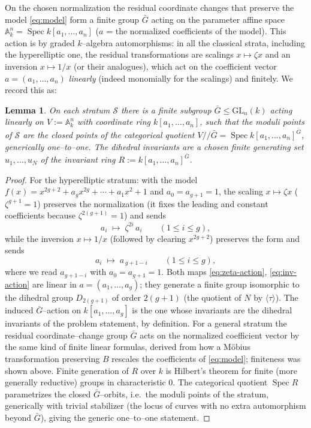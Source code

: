 \documentclass{amsart}
\newtheorem{lemma}[theorem]{Lemma}
\theoremstyle{definition}
\DeclareMathOperator{\Spec}{Spec}
\begin{document}
On the chosen normalization the residual coordinate changes that preserve the
model \eqref{eq:model} form a finite group $\bar G$ acting on the parameter affine
space $\mathbb{A}^n_k=\Spec k[a_1,\dots,a_n]$ ($a$ = the normalized coefficients of
the model). This action is by graded $k$--algebra automorphisms: in all the
classical strata, including the hyperelliptic one, the residual transformations
are scalings $x\mapsto \zeta x$ and an inversion $x\mapsto 1/x$ (or their
analogues), which act on the coefficient vector $a=(a_1,\dots,a_n)$ \emph{linearly}
(indeed monomially for the scalings) and finitely. We record this as:

\begin{lemma}\label{lem:linear}
On each stratum $\mathcal S$ there is a finite subgroup
$\bar G\le \mathrm{GL}_n(k)$ acting linearly on $V:=\mathbb{A}^n_k$ with
coordinate ring $k[a_1,\dots,a_n]$, such that the moduli points of $\mathcal S$ are
the closed points of the categorical quotient $V/\!\!/\bar G=\Spec
k[a_1,\dots,a_n]^{\bar G}$, generically one--to--one. The dihedral invariants are
a chosen finite generating set $u_1,\dots,u_N$ of the invariant ring
$R:=k[a_1,\dots,a_n]^{\bar G}$.
\end{lemma}

\begin{proof}
For the hyperelliptic stratum: with the model
$f(x)=x^{2g+2}+a_g x^{2g}+\cdots+a_1 x^2+1$ and $a_0=a_{g+1}=1$, the scaling
$x\mapsto\zeta x$ ($\zeta^{g+1}=1$) preserves the normalization (it fixes the
leading and constant coefficients because $\zeta^{2(g+1)}=1$) and sends
\begin{equation}\label{eq:zeta-action}
 a_i\;\longmapsto\;\zeta^{2i}\,a_i \qquad(1\le i\le g),
\end{equation}
while the inversion $x\mapsto 1/x$ (followed by clearing $x^{2g+2}$) preserves the
form and sends
\begin{equation}\label{eq:inv-action}
 a_i\;\longmapsto\;a_{\,g+1-i}\qquad(1\le i\le g),
\end{equation}
where we read $a_{g+1-i}$ with $a_0=a_{g+1}=1$. Both maps \eqref{eq:zeta-action},
\eqref{eq:inv-action} are linear in $a=(a_1,\dots,a_g)$; they generate a finite
group isomorphic to the dihedral group $D_{2(g+1)}$ of order $2(g+1)$ (the
quotient of $N$ by $\langle\tau\rangle$). The induced $\bar G$--action on
$k[a_1,\dots,a_g]$ is the one whose invariants are the dihedral invariants of the
problem statement, by definition. For a general stratum the residual
coordinate--change group $\bar G$ acts on the normalized coefficient vector by the
same kind of finite linear formulas, derived from how a M\"obius transformation
preserving $B$ rescales the coefficients of \eqref{eq:model}; finiteness was shown
above. Finite generation of $R$ over $k$ is Hilbert's theorem for finite (more
generally reductive) groups in characteristic $0$. The categorical quotient
$\Spec R$ parametrizes the closed $\bar G$--orbits, i.e.\ the moduli points of the
stratum, generically with trivial stabilizer (the locus of curves with no extra
automorphism beyond $\bar G$), giving the generic one--to--one statement.
\end{proof}
\end{document}
